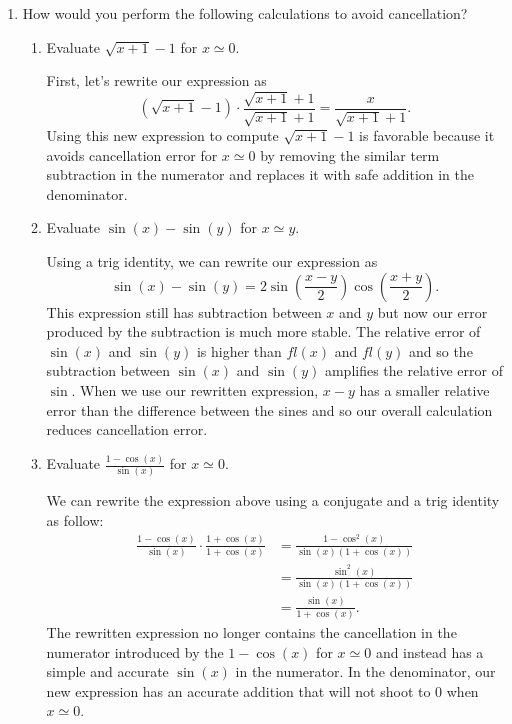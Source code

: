\documentclass[a4paper,10pt]{article}
\begin{document}
\begin{enumerate}[label = \arabic*.)]
    \item How would you perform the following calculations to avoid cancellation?
        \begin{enumerate}[label = \roman*.]
            \item Evaluate $\sqrt{x + 1} - 1$ for $x \simeq 0$.
            
            First, let's rewrite our expression as
            \[
                (\sqrt{x + 1} - 1) \cdot \frac{\sqrt{x + 1} + 1}{\sqrt{x + 1} + 1} = \frac{x}{\sqrt{x + 1} + 1}.
            \]
            Using this new expression to compute $\sqrt{x + 1} - 1$ is favorable because it avoids cancellation error for $x \simeq 0$ by removing the similar term subtraction in the numerator and replaces it with safe addition in the denominator.
            
            \item Evaluate $\sin(x) - \sin(y)$ for $x \simeq y$.
            
            Using a trig identity, we can rewrite our expression as
            \[
                \sin(x) - \sin(y) = 2 \sin\left(\frac{x - y}{2}\right) \cos\left( \frac{x + y}{2} \right).
            \]
            This expression still has subtraction between $ x $ and $ y $ but now our error produced by the subtraction is much more stable. The relative error of $ \sin(x) $ and $ \sin(y) $ is higher than $ fl(x) $ and $ fl(y) $ and so the subtraction between $ \sin(x) $ and $ \sin(y) $ amplifies the relative error of $ \sin $. When we use our rewritten expression, $ x - y $ has a smaller relative error than the difference between the sines and so our overall calculation reduces cancellation error.
             
            
            \item Evaluate $\frac{1 - \cos(x)}{\sin(x)}$ for $x \simeq 0$.
            
            We can rewrite the expression above using a conjugate and a trig identity as follow:
            \begin{align*}
                \frac{1 - \cos(x)}{\sin(x)} \cdot \frac{1 + \cos(x)}{1 + \cos(x)} &= \frac{1 - \cos^2(x)}{\sin(x) (1 + \cos(x))} \\
                &= \frac{\sin^2(x)}{\sin(x) (1 + \cos(x))} \\
                &= \frac{\sin(x)}{1 + \cos(x)}.
            \end{align*}
            The rewritten expression no longer contains the cancellation in the numerator introduced by the $1 - \cos(x)$ for $x \simeq 0$ and instead has a simple and accurate $\sin(x)$ in the numerator. In the denominator, our new expression has an accurate addition that will not shoot to 0 when $x \simeq 0$.
            

\end{enumerate}
\end{enumerate}
\end{document}
